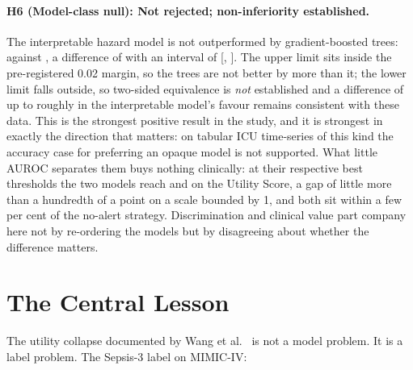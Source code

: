 \paragraph{H6 (Model-class null): Not rejected; non-inferiority established.}
The interpretable hazard model is not outperformed by gradient-boosted trees:
\pcAurocPrimaryB{} against \pcAurocGbtB, a difference of \pcHSixEst{} with an
interval of [\pcHSixCiLo, \pcHSixCiHi]. The upper limit sits inside the
pre-registered 0.02 margin, so the trees are not better by more than it; the
lower limit falls outside, so two-sided equivalence is \emph{not} established
and a difference of up to roughly \pcHSixCiLo{} in the interpretable model's
favour remains consistent with these data. This is the strongest positive
result in the study, and it is strongest in exactly the direction that matters:
on tabular ICU time-series of this kind the accuracy case for preferring an
opaque model is not supported. What little AUROC separates them buys nothing
clinically: at their respective best thresholds the two models reach
\pcUtilityMaxGbtB{} and \pcUtilityMaxPrimaryB{} on the Utility Score, a gap of
little more than a hundredth of a point on a scale bounded by 1, and both sit
within a few per cent of the no-alert strategy. Discrimination and clinical
value part company here not by re-ordering the models but by disagreeing about
whether the difference matters.


\section{The Central Lesson}

The utility collapse documented by Wang et al.\ \cite{wang2025srpm} is
not a model problem. It is a label problem. The Sepsis-3 label on MIMIC-IV:

